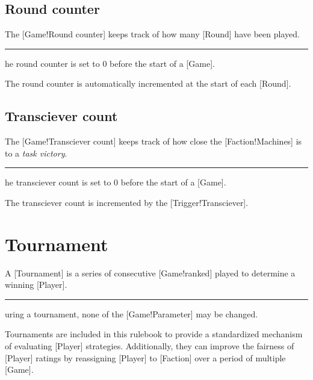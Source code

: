\subsection{Round counter}

The [Game!Round counter] keeps track of how many [Round] have been played.

\begin{rules}
    \rule{game.state.roundcounter.init} The round counter is set to \(0\) before the start of a [Game].
\end{rules}

The round counter is automatically incremented at the start of each [Round].

\subsection{Transciever count}

The [Game!Transciever count] keeps track of how close the [Faction!Machines] is to a \emph{task victory}.

\begin{rules}
    \rule{game.state.transcievercount.init} The transciever count is set to \(0\) before the start of a [Game].
\end{rules}

The transciever count is incremented by the [Trigger!Transciever].

\section{Tournament}

A [Tournament] is a series of consecutive [Game!ranked] played to determine a winning [Player].

\begin{rules}
    \rule{tournament.fair} During a tournament, none of the [Game!Parameter] may be changed.
\end{rules}

Tournaments are included in this rulebook to provide a standardized mechanism of evaluating [Player] strategies.
Additionally, they can improve the fairness of [Player] ratings by reassigning [Player] to [Faction] over a period of multiple [Game].

